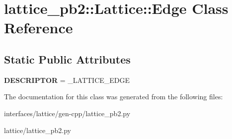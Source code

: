 \hypertarget{classlattice__pb2_1_1Lattice_1_1Edge}{
\section{lattice\_\-pb2::Lattice::Edge Class Reference}
\label{classlattice__pb2_1_1Lattice_1_1Edge}
}
\subsection*{Static Public Attributes}
\begin{DoxyCompactItemize}
\item 
\hypertarget{classlattice__pb2_1_1Lattice_1_1Edge_ac1e04b41973db8f1ffd918d785fd8cef}{
{\bfseries DESCRIPTOR} = \_\-LATTICE\_\-EDGE}
\label{classlattice__pb2_1_1Lattice_1_1Edge_ac1e04b41973db8f1ffd918d785fd8cef}

\end{DoxyCompactItemize}


The documentation for this class was generated from the following files:\begin{DoxyCompactItemize}
\item 
interfaces/lattice/gen-\/cpp/lattice\_\-pb2.py\item 
lattice/lattice\_\-pb2.py\end{DoxyCompactItemize}
